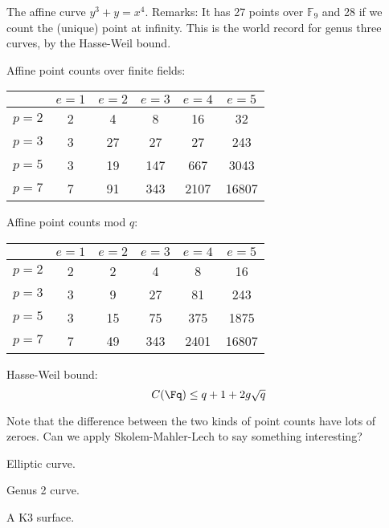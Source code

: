 \documentclass[a4paper]{article}
\begin{document}
The affine curve $y^3 + y = x^4$. Remarks: It has 27 points over $\mathbb{F}_9$ and 28 if we count the (unique) point at infinity. This is the world record for genus three curves, by the Hasse-Weil bound. 

Affine point counts over finite fields:
\begin{table}[h]
\centering
\begin{tabular}{| l | | c | c | c | c | c |}
\hline
& $e = 1$ & $e = 2$ & $e = 3$ & $e = 4$ & $e = 5$\\
\hline
\hline
$p = 2$ & 2 & 4 & 8 & 16 & 32 \\
\hline
$p = 3$ & 3 & 27 & 27 & 27 & 243 \\
\hline
$p = 5$ & 3 & 19 & 147 & 667 & 3043 \\
\hline
$p = 7$ & 7 & 91 & 343 & 2107 & 16807 \\
\hline
\end{tabular}
\end{table}

Affine point counts mod $q$:
\begin{table}[h]
\centering
\begin{tabular}{| l | | c | c | c | c | c |}
\hline
& $e = 1$ & $e = 2$ & $e = 3$ & $e = 4$ & $e = 5$\\
\hline
\hline
$p = 2$ & 2 & 2 & 4 & 8 & 16 \\
\hline
$p = 3$ & 3 & 9 & 27 & 81 & 243 \\
\hline
$p = 5$ & 3 & 15 & 75 & 375 & 1875 \\
\hline
$p = 7$ & 7 & 49 & 343 & 2401 & 16807 \\
\hline
\end{tabular}
\end{table}

Hasse-Weil bound: 
$$ C(\Fq) \leq q + 1 + 2 g \sqrt{q}  $$

Note that the difference between the two kinds of point counts have lots of zeroes. Can we apply Skolem-Mahler-Lech to say something interesting?
\begin{example}
Elliptic curve.

\end{example}


\begin{example}
Genus 2 curve.

\end{example}


\begin{example}
A K3 surface.

\end{example}
\end{document}
